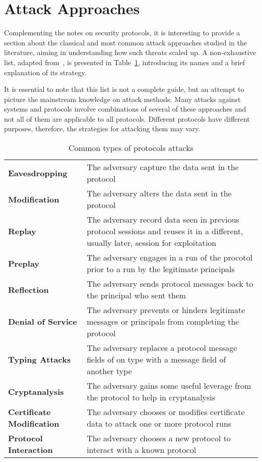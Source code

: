 \section{Attack Approaches}
Complementing the notes on security protocols, it is interesting to provide a section about the classical and most common attack approaches studied in the literature, aiming in understanding how such threats scaled up. A non-exhaustive list, adapted from~\cite{BoydMathuria2008}, is presented in Table~\ref{protocol-attacks}, introducing its names and a brief explanation of its strategy.

It is essential to note that this list is not a complete guide, but an attempt to picture the mainstream knowledge on attack methods. Many attacks against systems and protocols involve combinations of several of these approaches and not all of them are applicable to all protocols. Different protocols have different purposes, therefore, the strategies for attacking them may vary.

\begin{table}\label{protocol-attacks}
  \caption{Common types of protocols attacks}

  {\def\arraystretch{1.5}
  \begin{tabular}[c]{l p{10cm}}
    \toprule
    \textbf{Eavesdropping} & The adversary capture the data sent in the protocol \\
    \textbf{Modification} & The adversary alters the data sent in the protocol \\
    \textbf{Replay} & The adversary record data seen in previous protocol sessions and reuses it in a different, usually later, session for exploitation \\
    \textbf{Preplay} & The adversary engages in a run of the procotol prior to a run by the legitimate principals \\
    \textbf{Reflection} & The adversary sends protocol messages back to the principal who sent them \\
    \textbf{Denial of Service} & The adversary prevents or hinders legitimate messages or principals from completing the protocol \\
    \textbf{Typing Attacks} & The adversary replaces a protocol message fields of on type with a message field of another type \\
    \textbf{Cryptanalysis} & The adversary gains some useful leverage from the protocol to help in cryptanalysis \\
    \textbf{Certificate Modification} & The adversary chooses or modifies certificate data to attack one or more protocol runs \\
    \textbf{Protocol Interaction} & The adversary chooses a new protocol to interact with a known protocol \\
    \bottomrule
  \end{tabular}
  }

\end{table}
